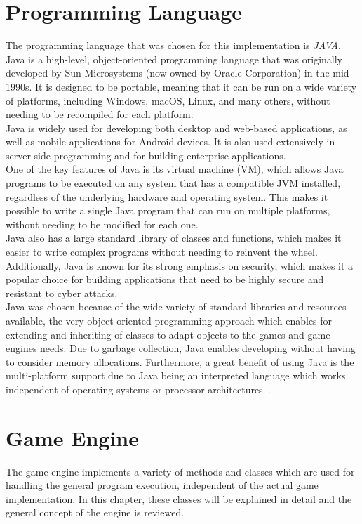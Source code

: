 \section{Programming Language}\label{sec:programming-language}
The programming language that was chosen for this implementation is \textit{JAVA}.
Java is a high-level, object-oriented programming language that was originally developed by Sun Microsystems (now owned by Oracle Corporation) in the mid-1990s.
It is designed to be portable, meaning that it can be run on a wide variety of platforms, including Windows, macOS,
Linux, and many others, without needing to be recompiled for each platform.
\\
Java is widely used for developing both desktop and web-based applications, as well as mobile applications for Android devices.
It is also used extensively in server-side programming and for building enterprise applications.
\\
One of the key features of Java is its virtual machine (VM), which allows Java programs to be executed on any system that has a compatible JVM installed, regardless of the underlying hardware and operating system.
This makes it possible to write a single Java program that can run on multiple platforms, without needing to be modified for each one.
\\
Java also has a large standard library of classes and functions, which makes it easier to write complex programs without needing to reinvent the wheel.
Additionally, Java is known for its strong emphasis on security, which makes it a popular choice for building applications that need to be highly secure
and resistant to cyber attacks.
\\
Java was chosen because of the wide variety of standard libraries and resources available, the very object-oriented programming approach which enables for
extending and inheriting of classes to adapt objects to the games and game engines needs.
Due to garbage collection, Java enables developing without having to consider memory allocations.
Furthermore, a great benefit of using Java is the multi-platform support due to Java being an interpreted language which works
independent of operating systems or processor architectures~\cite{JAVA}.

\section{Game Engine}\label{sec:game}
The game engine implements a variety of methods and classes which are used for handling the general program execution, independent of the actual game implementation.
In this chapter, these classes will be explained in detail and the general concept of the engine is reviewed.

